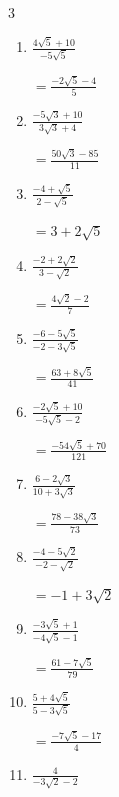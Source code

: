\begin{multicols}{3}
\begin{enumerate}
        $\displaystyle =\frac{20\sqrt{3}-103}{97}$

\columnbreak %

  \item $\displaystyle \frac{4\sqrt{5}+10}{-5\sqrt{5}}$

        $\displaystyle =\frac{-2\sqrt{5}-4}{5}$

  \item $\displaystyle \frac{-5\sqrt{3}+10}{3\sqrt{3}+4}$

        $\displaystyle =\frac{50\sqrt{3}-85}{11}$

  \item $\displaystyle \frac{-4+\sqrt{5}}{2-\sqrt{5}}$

        $\displaystyle =3+2\sqrt{5}$

  \item $\displaystyle \frac{-2+2\sqrt{2}}{3-\sqrt{2}}$

        $\displaystyle =\frac{4\sqrt{2}-2}{7}$

  \item $\displaystyle \frac{-6-5\sqrt{5}}{-2-3\sqrt{5}}$

        $\displaystyle =\frac{63+8\sqrt{5}}{41}$

\columnbreak %

\resetques

  \item $\displaystyle \frac{-2\sqrt{5}+10}{-5\sqrt{5}-2}$

        $\displaystyle =\frac{-54\sqrt{5}+70}{121}$

  \item $\displaystyle \frac{6-2\sqrt{3}}{10+3\sqrt{3}}$

        $\displaystyle =\frac{78-38\sqrt{3}}{73}$

  \item $\displaystyle \frac{-4-5\sqrt{2}}{-2-\sqrt{2}}$

        $\displaystyle =-1+3\sqrt{2}$

  \item $\displaystyle \frac{-3\sqrt{5}+1}{-4\sqrt{5}-1}$

        $\displaystyle =\frac{61-7\sqrt{5}}{79}$

  \item $\displaystyle \frac{5+4\sqrt{5}}{5-3\sqrt{5}}$

        $\displaystyle =\frac{-7\sqrt{5}-17}{4}$

\columnbreak %

  \item $\displaystyle \frac{4}{-3\sqrt{2}-2}$


\end{enumerate}
\end{multicols}
